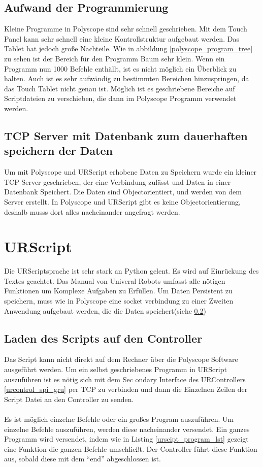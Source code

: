 \subsection{Aufwand der Programmierung}
\label{polyscope_aufwand}

Kleine Programme in Polyscope sind sehr schnell geschrieben. Mit dem Touch Panel kann sehr schnell eine kleine Kontrollstruktur aufgebaut werden. Das Tablet hat jedoch große Nachteile. Wie in abbildung \ref{polyscope_program_tree} zu sehen ist der Bereich für den Programm Baum sehr klein. Wenn ein Programm nun 1000 Befehle enthällt, ist es nicht möglich ein Überblick zu halten. Auch ist es sehr aufwändig zu bestimmten Bereichen hinzuspringen, da das Touch Tablet nicht genau ist. Möglich ist es geschriebene Bereiche auf Scriptdateien zu verschieben, die dann im Polyscope Programm verwendet werden. 

\subsection{TCP Server mit Datenbank zum dauerhaften speichern der Daten}
\label{tcp_datentank_sicherung_rel}

Um mit Polyscope und URScript erhobene Daten zu Speichern wurde ein kleiner TCP Server geschrieben, der eine Verbindung zulässt und Daten in einer Datenbank Speichert. Die Daten sind Objectorientiert, und werden von dem Server erstellt. 
In Polyscope und URScript gibt es keine Objectorientierung, deshalb musss dort alles nacheinander angefragt werden. 

\section{URScript}
\label{sec:ur_script_rel}

Die URScriptsprache ist sehr stark an Python gelent. Es wird auf Einrückung des Textes geachtet.
Das Manual von Univeral Robots umfasst alle nötigen Funktionen um Komplexe Aufgaben zu Erfüllen.
Um Daten Persistent zu speichern, muss wie in Polyscope eine socket verbindung zu einer Zweiten Anwendung aufgebaut werden, die die Daten speichert(siehe \ref{tcp_datentank_sicherung_rel})

\subsection{Laden des Scripts auf den Controller}
\label{load_script_rel}

Das Script kann nicht direkt auf dem Rechner über die Polyscope Software ausgeführt werden. Um ein selbst geschriebenes Programm in URScript auszuführen ist es nötig sich mit dem Sec
ondary Interface des URControllers \ref{urcontrol_spi_gru} per TCP zu verbinden und dann die Einzelnen Zeilen der Script Datei an den Controller zu senden.
\\\\
Es ist möglich einzelne Befehle oder ein großes Program auszuführen. Um einzelne Befehle auszuführen, werden diese nacheinander versendet.
Ein ganzes Programm wird versendet, indem wie in Listing \ref{urscipt_program_lst} gezeigt eine Funktion die ganzen Befehle umschließt. Der Controller führt diese Funktion aus, sobald diese mit dem ``end'' abgeschlossen ist.

